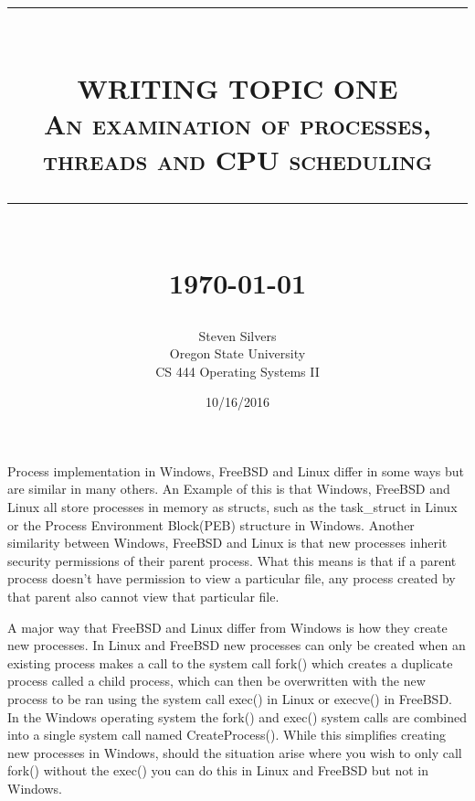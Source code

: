 \documentclass[10pt,serif,draftclsnofoot,onecolumn]{IEEEtran}
\newcommand{\HRule}[1]{\rule{\linewidth}{#1}}
\begin{document}
	\begin{titlepage}


	\title{ \normalsize \textsc{}
			\\ [2.0cm]
			\HRule{0.5pt} \\
			\LARGE \textbf{\uppercase{Writing topic one}}
			\\ \normalsize \textsc{An examination of processes, threads and CPU scheduling}
			\HRule{2pt} \\ [0.5cm]
			\normalsize \today \vspace*{5\baselineskip}}
	\date{10/16/2016}
	
	\author{Steven Silvers \\
			Oregon State University \\
			CS 444 Operating Systems II}
	\maketitle
	\end{titlepage}
	\newpage
	\par
			Process implementation in Windows, FreeBSD and Linux differ in some ways but are similar in many others. An Example of this is that Windows, FreeBSD and Linux all store processes in memory as structs, such as the task\_struct in Linux\cite{2} or the Process Environment Block(PEB) structure in Windows\cite{3}. Another similarity between Windows, FreeBSD and Linux is that new processes inherit security permissions of their parent process\cite{4}. What this means is that if a parent process doesn't have permission to view a particular file, any process created by that parent also cannot view that particular file.
	\newline
	\par
			A major way that FreeBSD and Linux differ from Windows is how they create new processes. In Linux and FreeBSD new processes can only be created when an existing process makes a call to the system call fork() which creates a duplicate process called a child process, which can then be overwritten with the new process to be ran using the system call exec() in Linux or execve() in FreeBSD\cite{1}. In the Windows operating system the fork() and exec() system calls are combined into a single system call named CreateProcess()\cite{4}. While this simplifies creating new processes in Windows, should the situation arise where you wish to only call fork() without the exec() you can do this in Linux and FreeBSD but not in Windows.
	\newline
\end{document}
